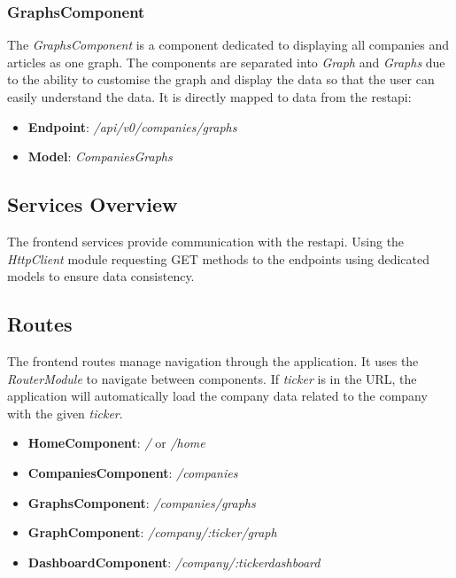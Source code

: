 \subsubsection{GraphsComponent}
\label{subsubsec:development-graphs}
The \textit{GraphsComponent} is a component dedicated to displaying all companies and articles as one graph. The components are separated into \textit{Graph} and \textit{Graphs} due to the ability to customise the graph and display the data so that the user can easily understand the data. It is directly mapped to data from the \acrshort{restapi}:

\begin{itemize}
    \item \textbf{Endpoint}: \textit{/api/v0/companies/graphs}
    \item \textbf{Model}: \textit{CompaniesGraphs}
\end{itemize}

\subsection{Services Overview}
\label{subsec:development-services-overview}
The frontend services provide communication with the \acrshort{restapi}. Using the \textit{HttpClient} module requesting GET methods to the endpoints using dedicated models to ensure data consistency.

\subsection{Routes}
\label{subsec:development-routes}
The frontend routes manage navigation through the application. It uses the \textit{RouterModule} to navigate between components. If \textit{ticker} is in the URL, the application will automatically load the company data related to the company with the given \textit{ticker}.

\begin{itemize}
    \item \textbf{HomeComponent}: \textit{/} or \textit{/home}
    \item \textbf{CompaniesComponent}: \textit{/companies}
    \item \textbf{GraphsComponent}: \textit{/companies/graphs}
    \item \textbf{GraphComponent}: \textit{/company/:ticker/graph}
    \item \textbf{DashboardComponent}: \textit{/company/:tickerdashboard}
\end{itemize}

